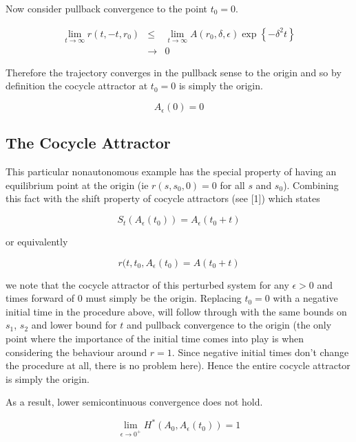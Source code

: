 Now consider pullback convergence to the point $t_{0}=0$.

\begin{eqnarray*}
  \lim_{t\rightarrow\infty}r(t,-t,r_0) & \leq & \lim_{t                 \rightarrow \infty} A(r_0,\delta,\epsilon) \exp\left\{- \delta^{2}t \right\} \\
  & \rightarrow & 0
\end{eqnarray*}

Therefore the trajectory converges in the pullback sense to the origin and so by definition the cocycle attractor at $t_0=0$ is simply the origin.

\[ A_{\epsilon}(0) = 0 \]

\subsection{The Cocycle Attractor}

This particular nonautonomous example has the special property of having an equilibrium point at the origin (ie $r(s,s_0,0) = 0$ for all $s$ and $s_0$). Combining this fact with the shift property of cocycle attractors (see [1]) which states

\[ S_t(A_{\epsilon}(t_0)) = A_{\epsilon}(t_0+t) \]

or equivalently

\[ r(t,t_{0},A_{\epsilon}(t_{0}) = A(t_{0}+t) \]

we note that the cocycle attractor of this perturbed system for any $\epsilon > 0$ and times forward of 0 must simply be the origin. Replacing $t_0 = 0$ with a negative initial time in the procedure above, will follow through with the same bounds on $s_1$, $s_2$ and lower bound for $t$ and pullback convergence to the origin (the only point where the importance of the initial time comes into play is when considering the behaviour around $r=1$. Since negative initial times don't change the procedure at all, there is no problem here). Hence the entire cocycle attractor is simply the origin.

As a result, lower semicontinuous convergence does not hold.

\[ \lim_{\epsilon \rightarrow 0^{+}} H^{*} (A_{0},A_{\epsilon}(t_0)) = 1 \]


